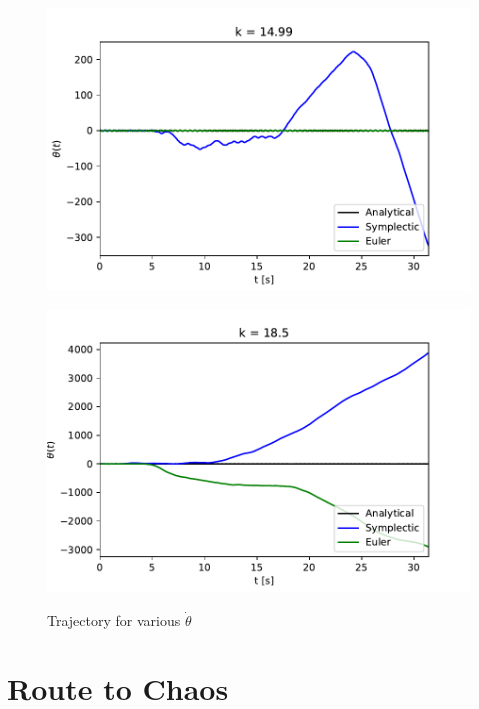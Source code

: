 \documentclass[12pt]{article}
\begin{document}
\begin{figure}[ht!]
\begin{minipage}[b]{0.4\textwidth}
		\label{phaseDot2}
	\end{minipage}
	\begin{minipage}[b]{0.4\textwidth}
	  \includegraphics[scale=0.6]{../figures/k15_nonlin.pdf}
		\label{phaseDot2}
	\end{minipage}
	\hfill
	\begin{minipage}[b]{0.4\textwidth}
	  \includegraphics[scale=0.6]{../figures/k17_nonlin.pdf}
		\label{phaseDot2}
	\end{minipage}
	\caption{Trajectory for various $\dot{\theta}$}
\end{figure}

\section*{Route to Chaos}
\end{document}
